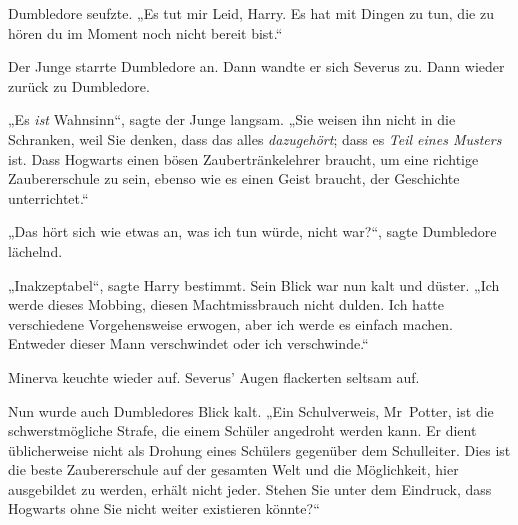 Dumbledore seufzte. „Es tut mir Leid, Harry. Es hat mit Dingen zu tun, die zu hören du im Moment noch nicht bereit bist.“ 

Der Junge starrte Dumbledore an. Dann wandte er sich Severus zu. Dann wieder zurück zu Dumbledore. 

„Es \emph{ist} Wahnsinn“, sagte der Junge langsam. „Sie weisen ihn nicht in die Schranken, weil Sie denken, dass das alles \emph{dazugehört}; dass es \emph{Teil eines Musters} ist. Dass Hogwarts einen bösen Zaubertränkelehrer braucht, um eine richtige Zaubererschule zu sein, ebenso wie es einen Geist braucht, der Geschichte unterrichtet.“ 

„Das hört sich wie etwas an, was ich tun würde, nicht war?“, sagte Dumbledore lächelnd. 

„Inakzeptabel“, sagte Harry bestimmt. Sein Blick war nun kalt und düster. „Ich werde dieses Mobbing, diesen Machtmissbrauch nicht dulden. Ich hatte verschiedene Vorgehensweise erwogen, aber ich werde es einfach machen. Entweder dieser Mann verschwindet oder ich verschwinde.“ 

Minerva keuchte wieder auf. Severus’ Augen flackerten seltsam auf. 

Nun wurde auch Dumbledores Blick kalt. „Ein Schulverweis, Mr~Potter, ist die schwerstmögliche Strafe, die einem Schüler angedroht werden kann. Er dient üblicherweise nicht als Drohung eines Schülers gegenüber dem Schulleiter. Dies ist die beste Zaubererschule auf der gesamten Welt und die Möglichkeit, hier ausgebildet zu werden, erhält nicht jeder. Stehen Sie unter dem Eindruck, dass Hogwarts ohne Sie nicht weiter existieren könnte?“ 

